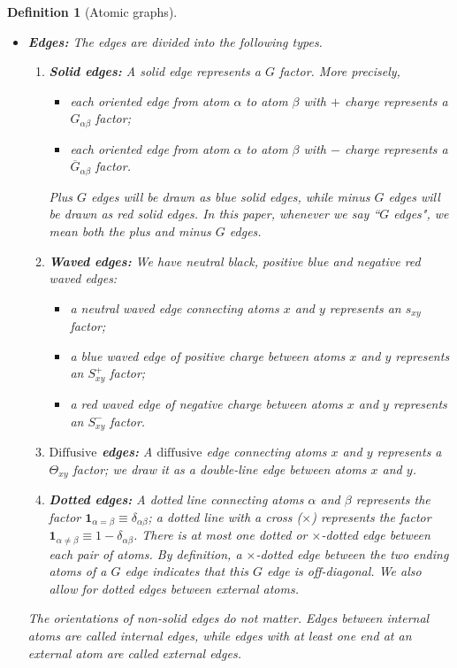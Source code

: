 \documentclass{article}
\newcommand{\1}{\mathds{1}}
\numberwithin{equation}{section}
\newcommand{\al}{\alpha}
\newcommand{\dashed}{\text{diffusive}}
\newcommand{\Dashed}{\text{Diffusive}}
\theoremstyle{plain} %
\newtheorem{definition}[theorem]{Definition}
\theoremstyle{remark}
\begin{document}
\begin{definition}[Atomic graphs]
\begin{itemize}
		
		\item {\bf Edges:} The edges are divided into the following types. 
		
		\begin{enumerate}
			
			
			\item{\bf  Solid edges:} A solid edge represents a $G$ factor. More precisely, 
			\begin{itemize}
				\item each oriented edge from atom $\alpha$ to atom $\beta$ with $+$ charge represents a $G_{\al\beta}$ factor; 
				\item each oriented edge from atom $\alpha$ to atom $\beta$ with $-$ charge represents a $\overline G_{\al\beta}$ factor.
			\end{itemize}
			Plus $G$ edges will be drawn as blue solid edges, while minus $G$ edges will be drawn as red solid edges. In this paper, whenever we say ``$G$ edges", we mean both the plus and minus $G$ edges.
				
			
			\item {\bf Waved edges:} We have neutral black, positive blue and negative red waved edges:  
			\begin{itemize}
				\item a neutral waved edge connecting atoms $x$ and $y$ represents an $s_{xy}$ factor; 
				
				\item a blue waved edge of positive charge between atoms $x$ and $y$ represents an $S^+_{xy}$ factor;
				
				\item a red waved edge of negative charge between atoms $x$ and $y$ represents an $S^-_{xy}$ factor.
			\end{itemize}
					
			
			\item {\bf $\Dashed$ edges:} A $\dashed$ edge connecting atoms $x$ and $y$ represents a ${\Theta}_{xy}$ factor;
			we draw it as a double-line edge between atoms $x$ and $y$. 			
			
			\item {\bf Dotted edges:} A dotted line connecting atoms $\al$ and $\beta$  represents the factor $\mathbf 1_{\al=\beta}\equiv \delta_{\al\beta}$; a dotted line with a cross ($\times$) represents the factor $\mathbf 1_{\al\ne \beta} \equiv  1-\delta_{\al\beta} $. There is at most one dotted or $\times$-dotted edge between each pair of atoms. %
By definition, a $\times$-dotted edge between the two ending atoms of a $G$ edge indicates that this $G$ edge is off-diagonal. We also allow for dotted edges between external atoms.   
		\end{enumerate}
		The orientations of non-solid edges do not matter. Edges between internal atoms are called \emph{internal edges}, while edges with at least one end at an external atom are called \emph{external edges}. 
		

\end{itemize}
\end{definition}
\end{document}
